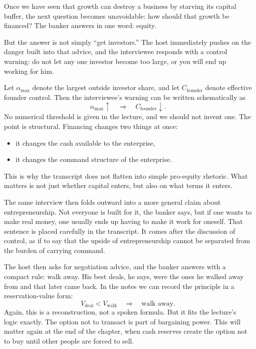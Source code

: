 Once we have seen that growth can destroy a business by starving its capital buffer, the next question becomes unavoidable: how should that growth be financed? The banker answers in one word: equity.

But the answer is not simply ``get investors.'' The host immediately pushes on the danger built into that advice, and the interviewee responds with a control warning: do not let any one investor become too large, or you will end up working for him.

Let \(\alpha_{\max}\) denote the largest outside investor share, and let \(C_{\mathrm{founder}}\) denote effective founder control. Then the interviewee's warning can be written schematically as
\begin{equation}
\alpha_{\max} \uparrow \quad \Longrightarrow \quad C_{\mathrm{founder}} \downarrow.
\end{equation}
No numerical threshold is given in the lecture, and we should not invent one. The point is structural. Financing changes two things at once:
\begin{itemize}
\item it changes the cash available to the enterprise,
\item it changes the command structure of the enterprise.
\end{itemize}

This is why the transcript does not flatten into simple pro-equity rhetoric. What matters is not just whether capital enters, but also on what terms it enters.

The same interview then folds outward into a more general claim about entrepreneurship. Not everyone is built for it, the banker says, but if one wants to make real money, one usually ends up having to make it work for oneself. That sentence is placed carefully in the transcript. It comes after the discussion of control, as if to say that the upside of entrepreneurship cannot be separated from the burden of carrying command.

The host then asks for negotiation advice, and the banker answers with a compact rule: walk away. His best deals, he says, were the ones he walked away from and that later came back. In the notes we can record the principle in a reservation-value form:
\begin{equation}
V_{\mathrm{deal}} < V_{\mathrm{walk}} \quad \Longrightarrow \quad \text{walk away}.
\end{equation}
Again, this is a reconstruction, not a spoken formula. But it fits the lecture's logic exactly. The option not to transact is part of bargaining power. This will matter again at the end of the chapter, when cash reserves create the option not to buy until other people are forced to sell.


